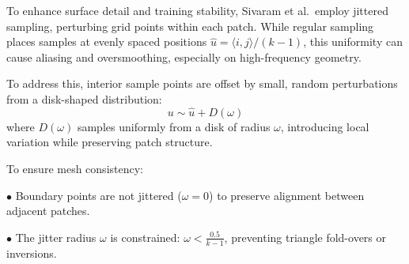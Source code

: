 To enhance surface detail and training stability, Sivaram et al.\ employ jittered sampling, perturbing grid points within each patch.
While regular sampling places samples at evenly spaced positions $\hat{u} = \langle i,j \rangle / (k - 1)$, this uniformity can cause aliasing and oversmoothing, especially on high-frequency geometry.

To address this, interior sample points are offset by small, random perturbations from a disk-shaped distribution:
\[u \sim \hat{u} + D(\omega)\]
where $D(\omega)$ samples uniformly from a disk of radius $\omega$, introducing local variation while preserving patch structure.

To ensure mesh consistency: 

\quad $\bullet$ Boundary points are not jittered ($\omega = 0$) to preserve alignment between adjacent patches.

\quad $\bullet$ The jitter radius $\omega$ is constrained: $\omega < \frac{0.5}{k - 1}$, preventing triangle fold-overs or inversions.


